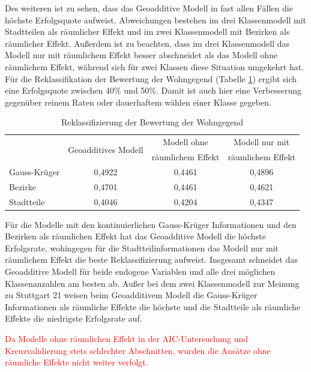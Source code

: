 \documentclass{Vorlage}
\begin{document}
Des weiteren ist zu sehen, dass das Geoadditive Modell in fast allen Fällen die höchste Erfolgsquote aufweist. Abweichungen bestehen im drei Klassenmodell mit Stadtteilen als räumlicher Effekt und im zwei Klassenmodell mit Bezirken als räumlicher Effekt. Außerdem ist zu beachten, dass im drei Klassenmodell das Modell nur mit räumlichem Effekt besser abschneidet als das Modell ohne räumlichem Effekt, während sich für zwei Klassen diese Situation umgekehrt hat.\\
Für die Reklassifikation der Bewertung der Wohngegend (Tabelle \ref{evalB}) ergibt sich eine Erfolgsquote zwischen 40\% und 50\%. Damit ist auch hier eine Verbesserung gegenüber reinem Raten oder dauerhaftem wählen einer Klasse gegeben. 

\begin{table}[h]
\centering
\caption{Reklassifizierung der Bewertung der Wohngegend}
\label{evalB}
\begin{tabular}{l|c|c|c}
\hline \hline
             & \multirow{2}{*}{Geoadditives Modell} & Modell ohne       & Modell nur mit    \\
             &                                      & räumlichem Effekt & räumlichem Effekt \\ \hline
Gauss-Krüger & 0,4922                               & 0,4461            & 0,4896            \\
Bezirke      & 0,4701                               & 0,4461            & 0,4621            \\
Stadtteile   & 0,4046                               & 0,4204            & 0,4347            \\ \hline \hline
\end{tabular}
\end{table}

Für die Modelle mit den kontinuierlichen Gauss-Krüger Informationen und den Bezirken als räumlichen Effekt hat das Geoadditive Modell die höchste Erfolgsrate, wohingegen für die Stadtteilinformationen das Modell nur mit räumlichem Effekt die beste Reklassifizierung aufweist. Insgesamt schneidet das Geoadditive Modell für beide endogene Variablen und alle drei möglichen Klassenanzahlen am besten ab. Außer bei dem zwei Klassenmodell zur Meinung zu Stuttgart 21 weisen beim Geoadditivem Modell die Gauss-Krüger Informationen als räumliche Effekte die höchste und die Stadtteile als räumliche Effekte die niedrigste Erfolgsrate auf.

\textcolor{red}{Da Modelle ohne räumlichen Effekt in der AIC-Untersuchung und Kreuzvalidierung stets schlechter 
Abschnitten, wurden die Ansätze ohne räumliche Effekte nicht weiter verfolgt.}
\end{document}
